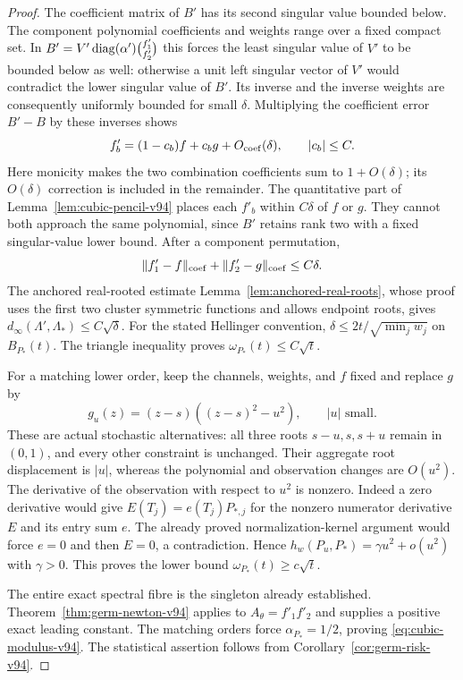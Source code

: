 \begin{proof}
The coefficient matrix of $B'$ has its second singular value bounded
below. The component polynomial coefficients and weights range over
a fixed compact set. In
$B'=V'\operatorname{diag}(\alpha')\binom{f'_1}{f'_2}$ this forces the least
singular value of $V'$ to be bounded below as well: otherwise a unit
left singular vector of $V'$ would contradict the lower singular
value of $B'$. Its inverse and the inverse weights are consequently
uniformly bounded for small $\delta$. Multiplying the coefficient
error $B'-B$ by these inverses shows
\[
 f'_b=(1-c_b)f+c_bg+O_{\rm coef}(\delta),\qquad |c_b|\le C.
\]
Here monicity makes the two combination coefficients sum to
$1+O(\delta)$; its $O(\delta)$ correction is included in the
remainder. The quantitative part of Lemma~\ref{lem:cubic-pencil-v94}
places each $f'_b$ within $C\delta$ of $f$ or $g$. They cannot both
approach the same polynomial, since $B'$ retains rank two with a
fixed singular-value lower bound. After a component permutation,
\begin{equation}\label{eq:cubic-coefficient-bound-v94}
 \|f'_1-f\|_{\rm coef}+\|f'_2-g\|_{\rm coef}\le C\delta.
\end{equation}
The anchored real-rooted estimate
Lemma~\ref{lem:anchored-real-roots}, whose proof uses the first two
cluster symmetric functions and allows endpoint roots, gives
$d_\infty(\Lambda',\Lambda_*)\le C\sqrt\delta$.
For the stated Hellinger convention,
$\delta\le2t/\sqrt{\min_jw_j}$ on $B_{P_*}(t)$.
The triangle inequality proves $\omega_{P_*}(t)\le C\sqrt t$.

For a matching lower order, keep the channels, weights, and $f$
fixed and replace $g$ by
\[
 g_u(z)=(z-s)((z-s)^2-u^2),\qquad |u|\text{ small}.
\]
These are actual stochastic alternatives: all three roots
$s-u,s,s+u$ remain in $(0,1)$, and every other constraint is
unchanged. Their aggregate root displacement is $|u|$, whereas
the polynomial and observation changes are $O(u^2)$. The derivative
of the observation with respect to $u^2$ is nonzero. Indeed a zero
derivative would give $E(T_j)=e(T_j)P_{*,j}$ for the nonzero
numerator derivative $E$ and its entry sum $e$. The already proved
normalization-kernel argument would force $e=0$ and then $E=0$,
a contradiction. Hence
$h_w(P_u,P_*)=\gamma u^2+o(u^2)$ with $\gamma>0$.
This proves the lower bound $\omega_{P_*}(t)\ge c\sqrt t$.

The entire exact spectral fibre is the singleton already established.
Theorem~\ref{thm:germ-newton-v94} applies to $A_\theta=f'_1f'_2$
and supplies a positive exact leading constant. The matching orders
force $\alpha_{P_*}=1/2$, proving \eqref{eq:cubic-modulus-v94}.
The statistical assertion follows from Corollary~\ref{cor:germ-risk-v94}.
\end{proof}

